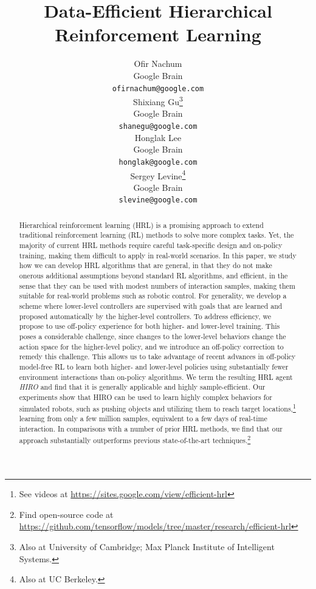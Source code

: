\documentclass{article}
\title{Data-Efficient Hierarchical Reinforcement Learning}
\author{
  Ofir Nachum \\
  Google Brain\\
  \texttt{ofirnachum@google.com} \\
  \And
  Shixiang Gu\thanks{Also at University of Cambridge; Max Planck Institute of Intelligent Systems.} \\
  Google Brain \\
  \texttt{shanegu@google.com} \\
  \AND
  Honglak Lee \\
  Google Brain \\
  \texttt{honglak@google.com} \\
  \And
  Sergey Levine\thanks{Also at UC Berkeley.} \\
  Google Brain \\
  \texttt{slevine@google.com} \\
}
\begin{document}

\maketitle

\setcounter{footnote}{0}

\begin{abstract}
  Hierarchical reinforcement learning (HRL) is a promising approach to extend traditional reinforcement learning (RL) methods to solve more complex tasks.
  Yet, the majority of current HRL methods require careful task-specific design and on-policy training, making them difficult to apply in real-world scenarios.
  In this paper, we study how we can develop HRL algorithms that are general, in that they do not make onerous additional assumptions beyond standard RL algorithms, and efficient, in the sense that they can be used with modest numbers of interaction samples, making them suitable for real-world problems such as robotic control. 
  For generality, 
  we develop a scheme where lower-level controllers are supervised with goals that are learned and proposed automatically by the higher-level controllers.
  To address efficiency, we propose to use off-policy experience for both higher- and lower-level training. This poses a considerable challenge, since changes to the lower-level behaviors change
  the action space
  for the higher-level policy, and we introduce an off-policy correction to remedy this challenge.
This allows us to take advantage of recent advances in off-policy model-free RL to learn both higher- and lower-level policies using substantially fewer environment interactions than on-policy algorithms.
We term the resulting HRL agent {\em HIRO} and find that it is generally applicable and highly sample-efficient.
  Our experiments show that HIRO can be used to learn highly complex behaviors for simulated robots, such as pushing objects and utilizing them to reach target locations,\footnote{See videos at \url{https://sites.google.com/view/efficient-hrl}} learning from only a few million samples, equivalent to a few days of real-time interaction. 
  In comparisons with a number of prior HRL methods, we find that our approach substantially outperforms previous state-of-the-art techniques.\footnote{Find open-source code at \url{https://github.com/tensorflow/models/tree/master/research/efficient-hrl}}
\end{abstract}
\end{document}
